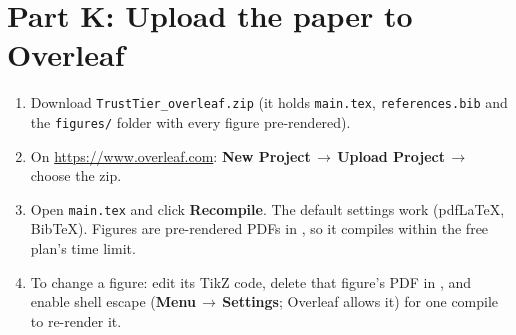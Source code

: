 \documentclass[11pt,a4paper]{article}
\newcommand{\ui}[1]{\textsf{\textbf{#1}}}
\newcommand{\code}[1]{\texttt{#1}}
\newcommand{\arr}{\,$\rightarrow$\,}
\begin{document}
\section{Part K: Upload the paper to Overleaf}
\begin{enumerate}
  \item Download \code{TrustTier\_overleaf.zip} (it holds \code{main.tex}, \code{references.bib} and the \code{figures/} folder with every figure pre-rendered).
  \item On \url{https://www.overleaf.com}: \ui{New Project}\arr\ui{Upload Project}\arr choose the zip.
  \item Open \code{main.tex} and click \ui{Recompile}. The default settings work (pdfLaTeX, BibTeX). Figures are pre-rendered PDFs in , so it compiles within the free plan's time limit.
  \item To change a figure: edit its TikZ code, delete that figure's PDF in , and enable shell escape (\ui{Menu}\arr\ui{Settings}; Overleaf allows it) for one compile to re-render it.
\end{enumerate}
\end{document}
